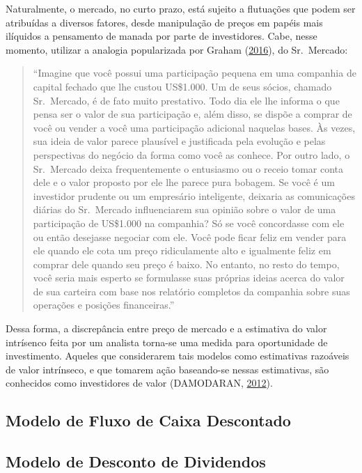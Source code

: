 \documentclass[grad,numbers]{coppe}
\begin{document}
  Naturalmente, o mercado, no curto prazo, está sujeito a flutuações que podem ser atribuídas a diversos fatores, desde manipulação de preços em papéis mais ilíquidos a pensamento de manada por parte de investidores. Cabe, nesse momento, utilizar a analogia popularizada por Graham (\protect\hyperlink{ref-graham2016}{2016}), do Sr.~Mercado:
  \begin{quote}
  ``Imagine que você possui uma participação pequena em uma companhia de capital fechado que lhe custou US\$1.000. Um de seus sócios, chamado Sr.~Mercado, é de fato muito prestativo. Todo dia ele lhe informa o que pensa ser o valor de sua participação e, além disso, se dispõe a comprar de você ou vender a você uma participação adicional naquelas bases. Às vezes, sua ideia de valor parece plausível e justificada pela evolução e pelas perspectivas do negócio da forma como você as conhece. Por outro lado, o Sr.~Mercado deixa frequentemente o entusiasmo ou o receio tomar conta dele e o valor proposto por ele lhe parece pura bobagem.
  Se você é um investidor prudente ou um empresário inteligente, deixaria as comunicações diárias do Sr.~Mercado influenciarem sua opinião sobre o valor de uma participação de US\$1.000 na companhia? Só se você concordasse com ele ou então desejasse negociar com ele. Você pode ficar feliz em vender para ele quando ele cota um preço ridiculamente alto e igualmente feliz em comprar dele quando seu preço é baixo. No entanto, no resto do tempo, você seria mais esperto se formulasse suas próprias ideias acerca do valor de sua carteira com base nos relatório completos da companhia sobre suas operações e posições financeiras.''
  \end{quote}
  Dessa forma, a discrepância entre preço de mercado e a estimativa do valor intrísenco feita por um analista torna-se uma medida para oportunidade de investimento. Aqueles que considerarem tais modelos como estimativas razoáveis de valor intrínseco, e que tomarem ação baseando-se nessas estimativas, são conhecidos como investidores de valor (DAMODARAN, \protect\hyperlink{ref-damodaran2012}{2012}).

  \hypertarget{modelo-de-fluxo-de-caixa-descontado}{%
  \subsection{Modelo de Fluxo de Caixa Descontado}\label{modelo-de-fluxo-de-caixa-descontado}}

  \hypertarget{modelo-de-desconto-de-dividendos}{%
  \subsection{Modelo de Desconto de Dividendos}\label{modelo-de-desconto-de-dividendos}}
\end{document}

